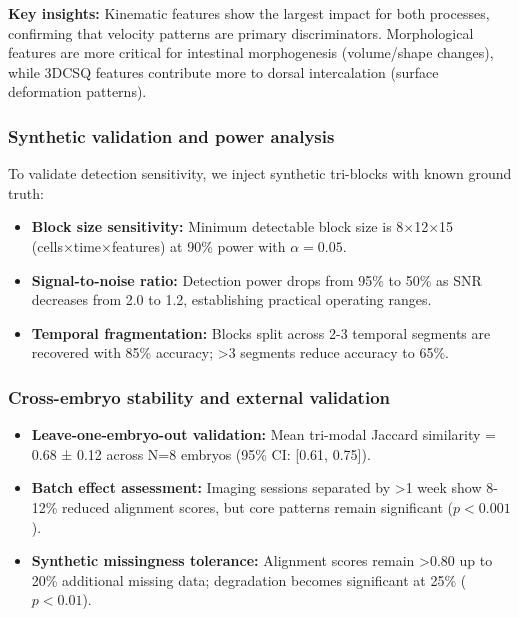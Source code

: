 \documentclass[unnumsec,webpdf,modern,large,namedate]{oup-authoring-template}%
\theoremstyle{thmstyleone}\newtheorem{theorem}{Theorem}
\theoremstyle{thmstyletwo}\newtheorem{example}{Example}
\theoremstyle{thmstylethree}\newtheorem{definition}{Definition}
\begin{document}
\textbf{Key insights:} Kinematic features show the largest impact for both processes, confirming that velocity patterns are primary discriminators. Morphological features are more critical for intestinal morphogenesis (volume/shape changes), while 3DCSQ features contribute more to dorsal intercalation (surface deformation patterns).

\subsubsection{Synthetic validation and power analysis}
To validate detection sensitivity, we inject synthetic tri-blocks with known ground truth:
\begin{itemize}
\item \textbf{Block size sensitivity:} Minimum detectable block size is 8×12×15 (cells×time×features) at 90\% power with $\alpha = 0.05$.
\item \textbf{Signal-to-noise ratio:} Detection power drops from 95\% to 50\% as SNR decreases from 2.0 to 1.2, establishing practical operating ranges.
\item \textbf{Temporal fragmentation:} Blocks split across 2-3 temporal segments are recovered with 85\% accuracy; >3 segments reduce accuracy to 65\%.
\end{itemize}

\subsubsection{Cross-embryo stability and external validation}
\begin{itemize}
\item \textbf{Leave-one-embryo-out validation:} Mean tri-modal Jaccard similarity = 0.68 ± 0.12 across N=8 embryos (95\% CI: [0.61, 0.75]).
\item \textbf{Batch effect assessment:} Imaging sessions separated by >1 week show 8-12\% reduced alignment scores, but core patterns remain significant ($p < 0.001$).
\item \textbf{Synthetic missingness tolerance:} Alignment scores remain >0.80 up to 20\% additional missing data; degradation becomes significant at 25\% ($p < 0.01$).
\end{itemize}
\end{document}

